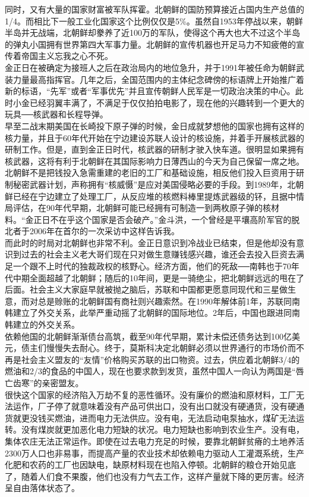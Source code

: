 \begin{multicols}{\theparacolNo}
同时，又有大量的国家财富被军队挥霍。北朝鲜的国防预算接近占国内生产总值的1/4。而相比下一般工业化国家这个比例仅仅是5\%。虽然自1953年停战以来，朝鲜半岛并无战端，北朝鲜却豢养了近100万的军队，使得这个再大也大不过这个半岛的弹丸小国拥有世界第四大军事力量。北朝鲜的宣传机器也开足马力不知疲倦的宣传着帝国主义忘我之心不死。\\

金正日在被确定为接班人之后在政治局内的地位急升，并于1991年被任命为朝鲜武装力量最高指挥官。几年之后，全国范围内的主体纪念碑傍的标语牌上开始推广着新的标语，“先军”或者“军事优先”并且宣传朝鲜人民军是一切政治决策的中心。此时小金已经羽翼丰满了，不满足于仅仅拍拍电影了，现在他的兴趣转到一个更大的玩具──核武器和长程导弹。\\

早至二战末期美国在长崎投下原子弹的时候，金日成就梦想他的国家也拥有这样的核力量，并且于60年代开始在宁边建设苏联人设计的核设施，并着手开展核武器的研制工作。但是，直到金正日时代，核武器的研制才驶入快车道。很明显如果拥有核武器，这将有利于北朝鲜在其国际影响力日薄西山的今天为自己保留一席之地。北朝鲜不是把钱投入急需重建的老旧的工厂和基础设施，相反他们投入巨资用于研制秘密武器计划，声称拥有“核威慑”是应对美国侵略必要的手段。到1989年，北朝鲜已经在宁边建立了处理工厂，从反应堆的核燃料棒里提炼武器级的钚，且据中情局评估，在90年代早期，北朝鲜可能已经拥有可制造一到两枚原子弹的核材料。“金正日不在乎这个国家是否会破产。”金斗洪，一个曾经是平壤高阶军官的脱北者于2006年在首尔的一次采访中这样告诉我。\\

而此时的时局对北朝鲜也非常不利。金正日意识到冷战业已结束，但是他却没有意识到过去的社会主义老大哥们现在只对做生意赚钱感兴趣，谁还会去投入巨资去满足一个跟不上时代的独裁政权的核野心。经济方面，他们的死敌──南韩也于70年代中期全面超越了北朝鲜；随后的10年间，更是一骑绝尘，把北朝鲜远远的甩在了后面。社会主义大家庭早就被抛之脑后，苏联和中国都更愿意同现代和三星做生意，而对总是赊账的北朝鲜国有商社则兴趣索然。在1990年解体前1年，苏联同南韩建立了外交关系，此举严重动摇了北朝鲜的国际地位。2年后，中国也跟进同南韩建立的外交关系。\\

依赖他国的北朝鲜渐渐债台高筑，截至90年代早期，累计未偿还债务达到100亿美元，债主们慢慢失去耐心。终于，莫斯科决定北朝鲜必须以世界通行的市场价而不再是社会主义盟友的“友情”价格购买苏联的出口物资。过去，供应着北朝鲜3/4的燃油和2/3的食品的中国人，现在也要求款到发货，虽然中国人一向认为两国是“唇亡齿寒”的亲密盟友。\\

很快这个国家的经济陷入万劫不复的恶性循环。没有廉价的燃油和原材料，工厂无法运作，厂子停了就意味着没有产品可供出口，没有出口就没有硬通货，没有硬通货就更没钱买燃油，进而电力无法供应。没有电，无法启动电泵抽水，煤矿无法运转。没有煤炭就更加恶化电力短缺的状况。电力短缺也影响到农业生产。没有电，集体农庄无法正常运作。即使在过去电力充足的时候，要靠北朝鲜贫瘠的土地养活2300万人口也非易事，而提高产量的农业技术却依赖电力驱动人工灌溉系统，生产化肥和农药的工厂也因缺电，缺原材料现在也陷入停顿。北朝鲜的粮仓开始见底了，随着人们食不果腹，他们也没有力气去工作，这样产量就下降的更厉害。经济呈自由落体状态了。\\


\end{multicols}

